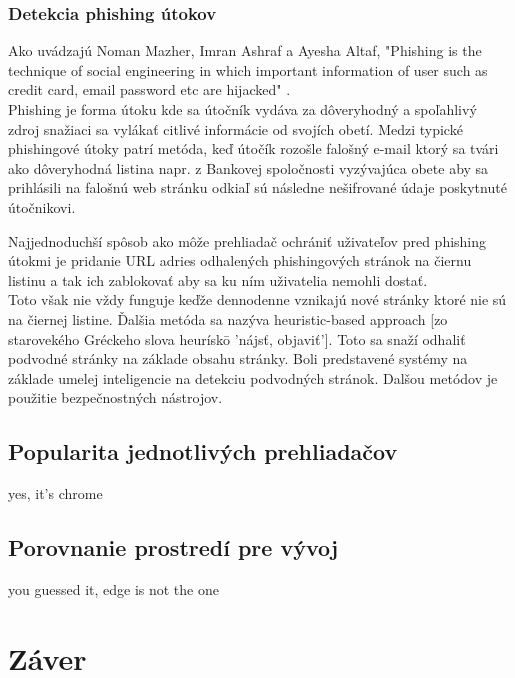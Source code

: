 \documentclass[10pt,Slovak,a4paper]{article}
\begin{document}
        \subsubsection{Detekcia phishing útokov}
            \begin{paragraph}
                Ako uvádzajú Noman Mazher, Imran Ashraf a Ayesha Altaf, "Phishing is the technique of social engineering in which important information of user such as credit card, email password etc are hijacked" \cite{6732784}. \\ Phishing je forma útoku kde sa útočník vydáva za dôveryhodný a spoľahlivý zdroj snažiaci sa vylákať citlivé informácie od svojích obetí. Medzi typické phishingové útoky patrí metóda, keď útočík rozošle falošný e-mail ktorý sa tvári ako dôveryhodná listina napr. z Bankovej spoločnosti vyzývajúca obete aby sa prihlásili na falošnú web stránku odkiaľ sú následne nešifrované údaje poskytnuté útočnikovi.
            \end{paragraph}
            \begin{paragraph}
                Najjednoduchší spôsob ako môže prehliadač ochrániť uživateľov pred phishing útokmi je pridanie URL adries odhalených phishingových stránok na čiernu listinu a tak ich zablokovať aby sa ku ním uživatelia nemohli dostať. \\
                Toto však nie vždy funguje keďže dennodenne vznikajú nové stránky ktoré nie sú na čiernej listine. Ďalšia metóda sa nazýva heuristic-based approach [zo starovekého Gréckeho slova heurískō 'nájsť, objaviť']. Toto sa snaží odhaliť podvodné stránky na základe obsahu stránky. Boli predstavené systémy na základe umelej inteligencie na detekciu podvodných stránok. Dalšou metódov je použitie bezpečnostných nástrojov.
            \end{paragraph}


        
    \subsection{Popularita jednotlivých prehliadačov}
        yes, it's chrome
    \subsection{Porovnanie prostredí pre vývoj}
        you guessed it, edge is not the one




\section{Záver} \label{zaver} %








\pagebreak

\end{document}

